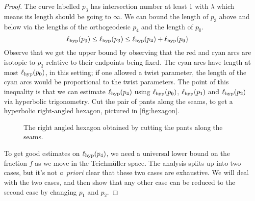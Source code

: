 \documentclass[12pt, reqno]{amsart}
\begin{document}
\begin{proof}
  The curve labelled $p_3$ has intersection number at least $1$ with $\lambda$ which means its length should be going to $\infty$.
  We can bound the length of $p_3$ above and below via the lengths of the orthogeodesic $p_4$ and the length of $p_0$.
 \begin{equation}
   \label{eq:up-1}
   \ell_{\mathrm{hyp}}(p_0) \leq \ell_{\mathrm{hyp}}(p_3) \leq \ell_{\mathrm{hyp}}(p_4) + \ell_{\mathrm{hyp}}(p_0)
 \end{equation}
 Observe that we get the upper bound by observing that the red and cyan arcs are isotopic to $p_3$ relative to their endpoints being fixed.
 The cyan arcs have length at most $\ell_{\mathrm{hyp}}(p_0)$, in this setting; if one allowed a twist parameter, the length of the cyan arcs would be proportional to the twist parameters.
 The point of this inequality is that we can estimate $\ell_{\mathrm{hyp}}(p_4)$ using $\ell_{\mathrm{hyp}}(p_0)$, $\ell_{\mathrm{hyp}}(p_1)$ and $\ell_{\mathrm{hyp}}(p_2)$ via hyperbolic trigonometry.
 Cut the pair of pants along the seams, to get a hyperbolic right-angled hexagon, pictured in \autoref{fig:hexagon}.
 \begin{figure}[h]
   \centering
   \caption{The right angled hexagon obtained by cutting the pants along the seams.}
   \label{fig:hexagon}
 \end{figure}

 To get good estimates on $\ell_{\mathrm{hyp}}(p_4)$, we need a universal lower bound on the fraction $f$ as we move in the Teichm\"uller space.
 The analysis splits up into two cases, but it's not \emph{a~priori} clear that these two cases are exhaustive.
 We will deal with the two cases, and then show that any other case can be reduced to the second case by changing $p_1$ and $p_2$.


\end{proof}
\end{document}
